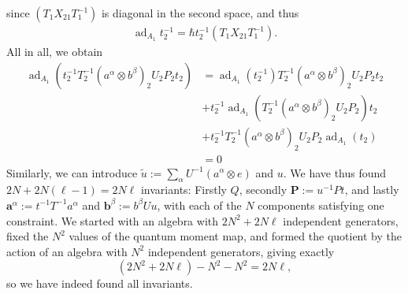 \documentclass[11pt]{report}
\theoremstyle{definition}
\theoremstyle{remark}
\theoremstyle{remark}
\begin{document}
since $(T_1 X_{21} T_1^{-1})$ is diagonal in the second space, and thus
\begin{align*}
\operatorname{ad}_{A_1} t_2^{-1} = \hbar t_2^{-1} (T_1 X_{21} T_1^{-1}).
\end{align*}
All in all, we obtain
\begin{align*}
\operatorname{ad}_{A_1}(t_2^{-1} T_2^{-1} (a^\alpha \otimes b^\beta)_2 U_2 P_2 t_2)
&= \operatorname{ad}_{A_1}(t_2^{-1}) T_2^{-1} (a^\alpha \otimes b^\beta)_2 U_2 P_2 t_2 \\
&+ t_2^{-1} \operatorname{ad}_{A_1}(T_2^{-1} (a^\alpha \otimes b^\beta)_2 U_2 P_2) t_2 \\
&+ t_2^{-1} T_2^{-1} (a^\alpha \otimes b^\beta)_2 U_2 P_2 \operatorname{ad}_{A_1}(t_2) \\
&= 0
\end{align*}
Similarly, we can introduce $\tilde u := \sum_\alpha U^{-1} (a^\alpha \otimes e)$ and $u$. We have thus found $2N + 2N(\ell-1) = 2N\ell$ invariants: Firstly $Q$, secondly $\mathbf{P} := u^{-1} P t$, and lastly $\mathbf{a}^\alpha := t^{-1} T^{-1} a^\alpha$ and $\mathbf{b}^\beta := b^\beta U u$, with each of the $N$ components satisfying one constraint. We started with an algebra with $2N^2+2N\ell$ independent generators, fixed the $N^2$ values of the quantum moment map, and formed the quotient by the action of an algebra with $N^2$ independent generators, giving exactly
\begin{equation*}
(2N^2+2N\ell)-N^2-N^2 = 2N\ell,
\end{equation*}
so we have indeed found all invariants.
\end{document}
